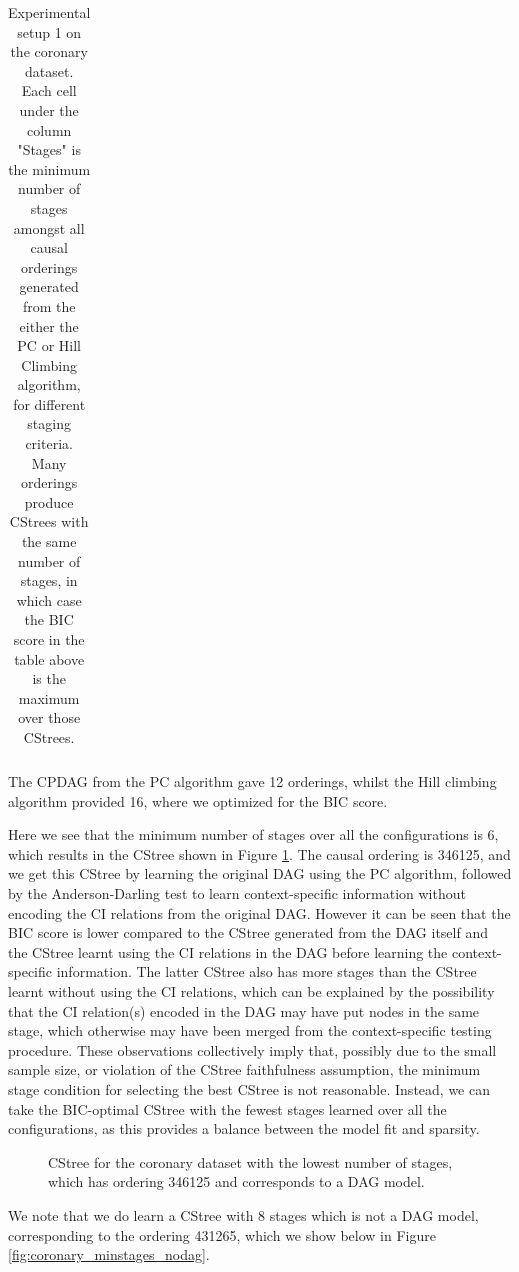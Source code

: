 \documentclass{tufte-book}
\begin{document}
\begin{table}[]
\begin{tabular}{cccccccccccccccc}
\caption{Experimental setup 1 on the coronary dataset. Each cell under the column "Stages" is the minimum number of stages amongst all causal orderings generated from the either the PC or Hill Climbing algorithm, for different staging criteria. Many orderings produce CStrees with the same number of stages, in which case the BIC score in the table above is the maximum over those CStrees.}
\end{tabular}
\end{table}

The CPDAG from the PC algorithm gave 12 orderings, whilst the Hill climbing algorithm provided 16, where we optimized for the BIC score.


Here we see that the minimum number of stages over all the configurations is 6, which results in the CStree shown in Figure \ref{fig:coronary1}. The causal ordering is 346125, and we get this CStree by learning the original DAG using the PC algorithm, followed by the Anderson-Darling test to learn context-specific information without encoding the CI relations from the original DAG. However it can be seen that the BIC score is lower compared to the CStree generated from the DAG itself and the CStree learnt using the CI relations in the DAG before learning the context-specific information. The latter CStree also has more stages than the CStree learnt without using the CI relations, which can be explained by the possibility that the CI relation(s) encoded in the DAG may have put nodes in the same stage, which otherwise may have been merged from the context-specific testing procedure. These observations collectively imply that, possibly due to the small sample size, or violation of the CStree faithfulness assumption, the minimum stage condition for selecting the best CStree is not reasonable. Instead, we can take the BIC-optimal CStree with the fewest stages learned over all the configurations, as this provides a balance between the model fit and sparsity.

\begin{figure}[]\label{fig:coronary1}
   \begin{floatrow}
%
\caption{CStree for the coronary dataset with the lowest number of stages, which has ordering 346125 and corresponds to a DAG model.}
        
   \end{floatrow}
\end{figure}

We note that we do learn a CStree with 8 stages which is not a DAG model, corresponding to the ordering 431265, which we show below in Figure \ref{fig:coronary_minstages_nodag}.
\end{document}
